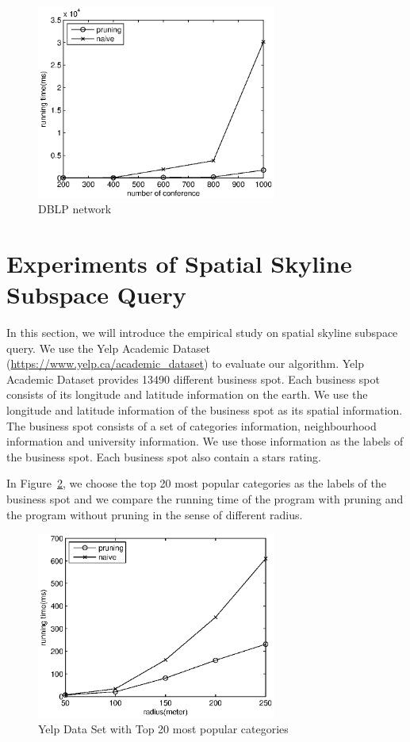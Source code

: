 \begin{figure}[H]
    \centering
      \includegraphics[width=0.7\textwidth]{figs/DBLP}
    \caption{\label{fig:exp:dblp}DBLP network}
\end{figure}

\section{Experiments of Spatial Skyline Subspace Query}

In this section, we will introduce the empirical study on spatial skyline subspace query. We use the Yelp Academic Dataset (\url{https://www.yelp.ca/academic_dataset}) to evaluate our algorithm. Yelp Academic Dataset provides 13490 different business spot. Each business spot consists of its longitude and latitude information on the earth. We use the longitude and latitude information of the business spot as its spatial information. The business spot consists of a set of categories information, neighbourhood information and university information. We use those information as the labels of the business spot. Each business spot also contain a stars rating.

In Figure~\ref{fig:exp:yelp20l}, we choose the top 20 most popular categories as the labels of the business spot and we compare the running time of the program with pruning and the program without pruning in the sense of different radius.

\begin{figure}[h]
    \centering
      \includegraphics[width=0.7\textwidth]{figs/YelpTop20Labels}
    \caption{\label{fig:exp:yelp20l}Yelp Data Set with Top 20 most popular categories}
\end{figure}

